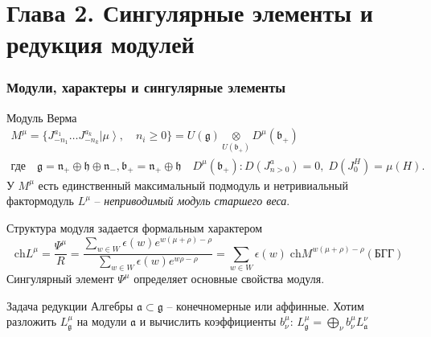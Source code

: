 \documentclass[pdftex]{beamer}
\newcommand{\gf}{\mathfrak{g}}
\newcommand{\af}{\mathfrak{a}}
\newcommand{\bff}{\mathfrak{b}}
\newcommand{\hf}{\mathfrak{h}}
\theoremstyle{definition} \newtheorem{Def}{Определение}
\begin{document}
\section{Глава 2. Сингулярные элементы и редукция модулей}

\begin{frame}
  \frametitle{Модули, характеры и сингулярные элементы}

Модуль Верма 
\begin{multline*}
 M^{\mu}=\{J^{a_1}_{-n_1}\dots J^{a_k}_{-n_k}\left| \mu \right>, \quad n_i \geq 0\}=U(\gf)\underset{U(\bff_{+})}{\otimes} D^{\mu}(\bff_{+}) \\ \mbox{где} \quad     \gf=\mathfrak{n}_{+}\oplus \hf \oplus\mathfrak{n}_{-}, \bff_{+}=\mathfrak{n}_{+}\oplus \hf\quad D^{\mu}(\bff_{+}): D(J^a_{n>0})=0,\; D(J^H_0)=\mu(H).
\end{multline*}
У $M^{\mu}$ есть единственный максимальный подмодуль и нетривиальный фактормодуль $L^{\mu}$ -- 
{\it неприводимый модуль старшего веса}. 

Структура модуля задается формальным характером
\begin{equation*}
  \label{eq:13}
  \mathrm{ch} L^{\mu}=\frac{\Psi^{\mu}}{R}=\frac{\sum_{w\in W} \epsilon(w) e^{w(\mu+\rho)-\rho}}{\sum_{w\in W}\epsilon(w) e^{w\rho-\rho}}=\sum_{w\in W} \epsilon(w)\; \mathrm{ch} M^{w(\mu+\rho)-\rho} (\mbox{БГГ})
\end{equation*}
Сингулярный элемент $\Psi^{\mu}$ определяет основные свойства модуля.
\begin{block}{Задача редукции}
  Алгебры $\af\subset\gf$ -- конечномерные или аффинные. Хотим разложить $L^{\mu}_{\gf}$ на модули $\af$ и вычислить коэффициенты $b^{\mu}_{\nu}$:
  $L^{\mu}_{\gf}=\bigoplus\limits_{\nu} b^{\mu}_{\nu} L^{\nu}_{\af} $
\end{block}
\end{frame}
\end{document}
